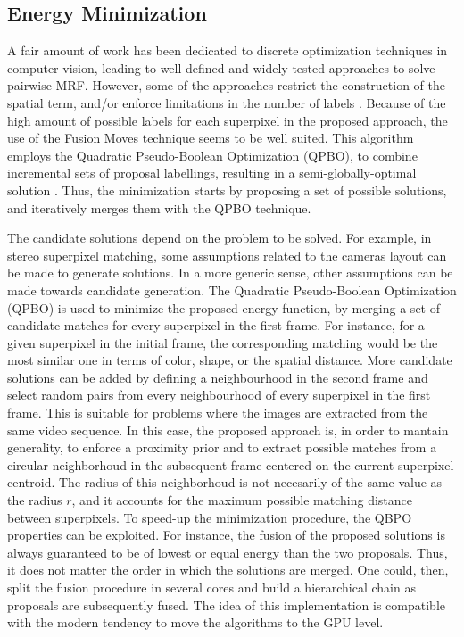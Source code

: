 \subsection{Energy Minimization}

A fair amount of work has been dedicated to discrete optimization techniques in computer vision,
leading to well-defined and widely tested approaches to solve pairwise MRF\cite{c3}\cite{c4}.
However, some of the approaches restrict the construction of the spatial term, and/or enforce
limitations in the number of labels \cite{c3}.
Because of the high amount of possible labels for  each superpixel in the proposed approach, the use of the
Fusion Moves \cite{c7} technique seems to be well suited.
This algorithm employs the Quadratic Pseudo-Boolean Optimization (QPBO), to combine
incremental sets of proposal labellings, resulting in a semi-globally-optimal solution \cite{c4}.
Thus, the minimization starts by proposing a set of possible solutions, and iteratively merges them with
the QPBO technique. 

The candidate solutions depend on the problem to be solved. 
For example, in stereo superpixel matching, some assumptions related to the cameras 
layout can be made to generate solutions. In a more generic sense, other assumptions can be made towards 
candidate generation. 
The Quadratic Pseudo-Boolean Optimization (QPBO) \cite{c3}\cite{c4} is used to minimize the proposed energy function, 
by merging a set of candidate matches for every superpixel in the first frame.
For instance, for a given superpixel in the initial frame, the corresponding 
matching would be the most similar one in terms of color, shape, or the spatial distance. More candidate solutions can be added by defining a
neighbourhood in the second frame and select random pairs from every neighbourhood of every superpixel
in the first frame. This is suitable for problems where the images are extracted from the same video
sequence. 
In this case, the proposed approach is, in order to mantain generality, to enforce a proximity prior and to extract possible matches from 
a circular neighborhoud in the subsequent frame centered on the current superpixel centroid. The radius of this neighborhoud is not necesarily 
of the same value as the radius $r$, and it accounts for the maximum possible matching distance between superpixels.
To speed-up the minimization procedure, the QBPO properties can be exploited. For instance, the fusion of the
proposed solutions is always guaranteed to be of lowest or equal energy than the two proposals. Thus, it does not matter the order in which the solutions are merged. 
One could, then, split the fusion procedure in several cores and build a hierarchical chain as proposals are subsequently fused. The idea of this implementation is compatible with 
the modern tendency to move the algorithms to the GPU level.


